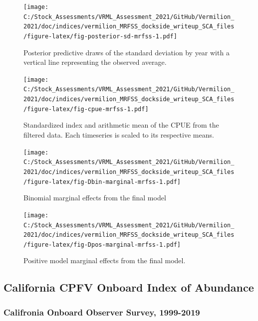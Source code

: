 \documentclass[
  english,
  a4paper,
]{article}
\begin{document}
\begin{figure}
\centering
\texttt{[image: C:/Stock\_Assessments/VRML\_Assessment\_2021/GitHub/Vermilion\_2021/doc/indices/vermilion\_MRFSS\_dockside\_writeup\_SCA\_files/figure-latex/fig-posterior-sd-mrfss-1.pdf]}
\caption{\label{fig:fig-posterior-sd-mrfss}Posterior predictive draws of the standard deviation by year with a vertical line representing the observed average.}
\end{figure}

\begin{figure}
\centering
\texttt{[image: C:/Stock\_Assessments/VRML\_Assessment\_2021/GitHub/Vermilion\_2021/doc/indices/vermilion\_MRFSS\_dockside\_writeup\_SCA\_files/figure-latex/fig-cpue-mrfss-1.pdf]}
\caption{\label{fig:fig-cpue-mrfss}Standardized index and arithmetic mean of the CPUE from the filtered data. Each timeseries is scaled to its respective means.}
\end{figure}

\begin{figure}
\centering
\texttt{[image: C:/Stock\_Assessments/VRML\_Assessment\_2021/GitHub/Vermilion\_2021/doc/indices/vermilion\_MRFSS\_dockside\_writeup\_SCA\_files/figure-latex/fig-Dbin-marginal-mrfss-1.pdf]}
\caption{\label{fig:fig-Dbin-marginal-mrfss}Binomial marginal effects from the final model}
\end{figure}

\begin{figure}
\centering
\texttt{[image: C:/Stock\_Assessments/VRML\_Assessment\_2021/GitHub/Vermilion\_2021/doc/indices/vermilion\_MRFSS\_dockside\_writeup\_SCA\_files/figure-latex/fig-Dpos-marginal-mrfss-1.pdf]}
\caption{\label{fig:fig-Dpos-marginal-mrfss}Positive model marginal effects from the final model.}
\end{figure}

\clearpage

\hypertarget{cpfv-index}{%
\subsection{California CPFV Onboard Index of Abundance}\label{cpfv-index}}

\hypertarget{califronia-onboard-observer-survey-1999-2019}{%
\subsubsection{Califronia Onboard Observer Survey, 1999-2019}\label{califronia-onboard-observer-survey-1999-2019}}
\end{document}
